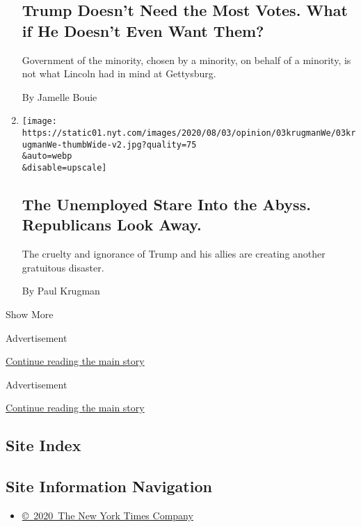 \begin{enumerate}
{  \subsection{Trump Doesn't Need the Most Votes. What if He Doesn't Even
  Want
  Them?}\label{trump-doesnt-need-the-most-votes-what-if-he-doesnt-even-want-them}}

  Government of the minority, chosen by a minority, on behalf of a
  minority, is not what Lincoln had in mind at Gettysburg.

  By Jamelle Bouie
\item
  \href{/2020/08/03/opinion/republicans-unemployed-coronavirus.html}{}

  \texttt{[image: https://static01.nyt.com/images/2020/08/03/opinion/03krugmanWe/03krugmanWe-thumbWide-v2.jpg?quality=75\\\&auto=webp\\\&disable=upscale]}

  \hypertarget{the-unemployed-stare-into-the-abyss-republicans-look-away}{%
  \subsection{The Unemployed Stare Into the Abyss. Republicans Look
  Away.}\label{the-unemployed-stare-into-the-abyss-republicans-look-away}}

  The cruelty and ignorance of Trump and his allies are creating another
  gratuitous disaster.

  By Paul Krugman
\end{enumerate}

Show More

Advertisement

\protect\hyperlink{after-mid2}{Continue reading the main story}

Advertisement

\protect\hyperlink{after-mktg}{Continue reading the main story}

\hypertarget{site-index}{%
\subsection{Site Index}\label{site-index}}

\hypertarget{site-information-navigation}{%
\subsection{Site Information
Navigation}\label{site-information-navigation}}

\begin{itemize}
\tightlist
\item
  \href{https://help.nytimes.com/hc/en-us/articles/115014792127-Copyright-notice}{©~2020~The
  New York Times Company}
\end{itemize}

